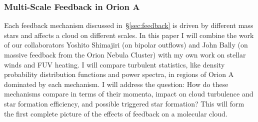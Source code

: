 \subsubsection{Multi-Scale Feedback in Orion A}\label{sec:paper2}
        Each feedback mechanism discussed in~\S\ref{sec:feedback} is driven by different mass stars and affects a cloud on different scales. In this paper I will combine the work of our collaborators Yoshito Shimajiri (on bipolar outflows) and John Bally (on massive feedback from the Orion Nebula Cluster) with my own work on stellar winds and FUV heating. I will compare turbulent statistics, like density probability distribution functions and power spectra, in regions of Orion A dominated by each mechanism. I will address the question: How do these mechanisms compare in terms of their momenta, impact on cloud turbulence and star formation efficiency, and possible triggered star formation? This will form the first complete picture of the effects of feedback on a molecular cloud.
